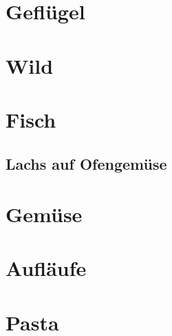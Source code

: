 \documentclass[ngerman,12pt,parskip=half]{scrbook}
\begin{document}
\chapter{Geflügel}

\clearpage

\chapter{Wild}

\clearpage

\chapter{Fisch}

\clearpage

	\section{Lachs auf Ofengemüse}
	
	\clearpage

\chapter{Gemüse}

\clearpage

\chapter{Aufläufe}


\clearpage

\chapter{Pasta}
\end{document}
